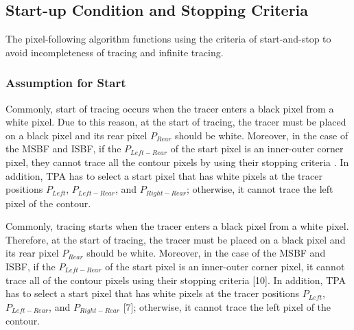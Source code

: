 \subsection{Start-up Condition and Stopping Criteria}

The pixel-following algorithm functions using the criteria of start-and-stop to avoid incompleteness of tracing and infinite tracing.

\subsubsection{Assumption for Start}

Commonly, start of tracing occurs when the tracer enters a black pixel from a white pixel. Due to this reason, at the start of tracing, the tracer must be placed on a black pixel and its rear pixel $P_{Rear}$ should be white. Moreover, in the case of the MSBF and ISBF, if the $P_{Left-Rear}$ of the start pixel is an inner-outer corner pixel, they cannot trace all the contour pixels by using their stopping criteria \cite{Cheong2006Advanced}. In addition, TPA has to select a start pixel that has white pixels at the tracer positions $P_{Left}$, $P_{Left-Rear}$, and $P_{Right-Rear}$\cite{Ghuneim2000Contour}; otherwise, it cannot trace the left pixel of the contour. 

Commonly, tracing starts when the tracer enters a black pixel from a white pixel. Therefore, at the start of tracing, the tracer must be placed on a black pixel and its rear pixel $P_{Rear}$ should be white. Moreover, in the case of the MSBF and ISBF, if the $P_{Left-Rear}$ of the start pixel is an inner-outer corner pixel, it cannot trace all of the contour pixels using their stopping criteria [10]. In addition, TPA has to select a start pixel that has white pixels at the tracer positions $P_{Left}$, $P_{Left-Rear}$, and $P_{Right-Rear}$ [7]; otherwise, it cannot trace the left pixel of the contour. 

